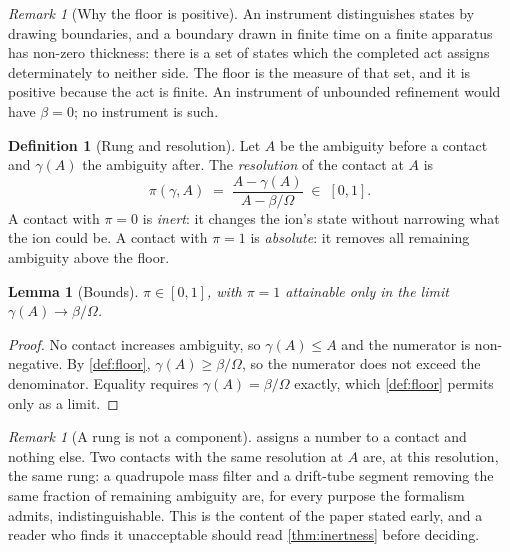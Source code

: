\documentclass[11pt,a4paper]{article}
\theoremstyle{plain}
\newtheorem{lemma}[theorem]{Lemma}
\theoremstyle{definition}
\newtheorem{definition}[theorem]{Definition}
\theoremstyle{remark}
\newtheorem{remark}[theorem]{Remark}
\newcommand{\flo}{\beta}
\newcommand{\pow}{\pi}
\newcommand{\Tot}{\Omega}
\newcommand{\Rung}{\gamma}
\newcommand{\Amb}{A}
\begin{document}
\begin{remark}[Why the floor is positive]
\label{rem:floorpos}
An instrument distinguishes states by drawing boundaries, and a boundary drawn
in finite time on a finite apparatus has non-zero thickness: there is a set of
states which the completed act assigns determinately to neither side. The floor
is the measure of that set, and it is positive because the act is finite. An
instrument of unbounded refinement would have $\flo = 0$; no instrument is such.
\end{remark}

\begin{definition}[Rung and resolution]
\label{def:rung}
Let $\Amb$ be the ambiguity before a contact and $\Rung(\Amb)$ the ambiguity
after. The \emph{resolution} of the contact at $\Amb$ is
\begin{equation}
\label{eq:power}
\pow(\Rung, \Amb) \;=\; \frac{\Amb - \Rung(\Amb)}{\Amb - \flo/\Tot} \;\in\; [0,1].
\end{equation}
A contact with $\pow = 0$ is \emph{inert}: it changes the ion's state without
narrowing what the ion could be. A contact with $\pow = 1$ is \emph{absolute}:
it removes all remaining ambiguity above the floor.
\end{definition}

\begin{lemma}[Bounds]
\label{lem:powbound}
$\pow \in [0,1]$, with $\pow = 1$ attainable only in the limit $\Rung(\Amb) \to
\flo/\Tot$.
\end{lemma}

\begin{proof}
No contact increases ambiguity, so $\Rung(\Amb) \le \Amb$ and the numerator is
non-negative. By \cref{def:floor}, $\Rung(\Amb) \ge \flo/\Tot$, so the numerator
does not exceed the denominator. Equality requires $\Rung(\Amb) = \flo/\Tot$
exactly, which \cref{def:floor} permits only as a limit.
\end{proof}

\begin{remark}[A rung is not a component]
\label{rem:rungisnot}
 assigns a number to a contact and nothing else. Two contacts
with the same resolution at $\Amb$ are, at this resolution, the same rung: a
quadrupole mass filter and a drift-tube segment removing the same fraction of
remaining ambiguity are, for every purpose the formalism admits,
indistinguishable. This is the content of the paper stated early, and a reader
who finds it unacceptable should read \cref{thm:inertness} before deciding.
\end{remark}
\end{document}
